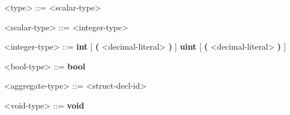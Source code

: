 
\begin{mdframed}
\begin{grammar}

<type> ::=
<scalar-type>

<scalar-type> ::=
<integer-type>

<integer-type> ::=
\textbf{int} [ \textbf{(} <decimal-literal> \textbf{)} ]
\alt \textbf{uint} [ \textbf{(} <decimal-literal> \textbf{)} ]

<bool-type> ::=
\textbf{bool}

<aggregate-type> ::=
<struct-decl-id>

<void-type> ::=
\textbf{void}

\end{grammar}
\end{mdframed}

